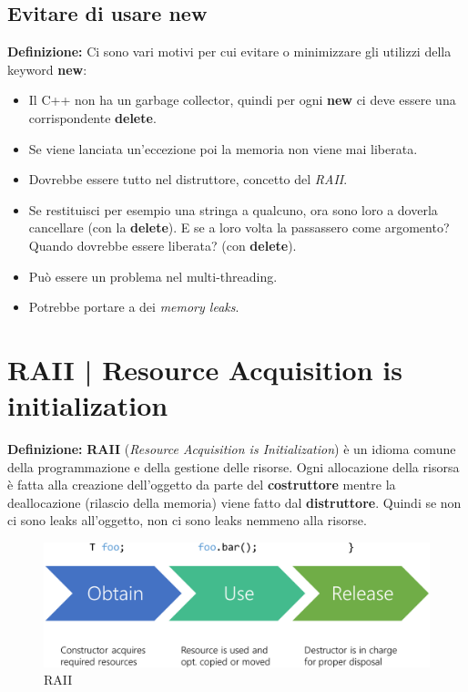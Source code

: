 \subsection{Evitare di usare new}

\textsf{\small \textbf{Definizione: } Ci sono vari motivi per cui evitare o minimizzare gli utilizzi della keyword \textbf{new}: } \\

\begin{itemize}
	\item \textsf{\small Il C++ non ha un garbage collector, quindi per ogni \textbf{new} ci deve essere una corrispondente \textbf{delete}.}
	\item \textsf{\small Se viene lanciata un'eccezione poi la memoria non viene mai liberata.}
	\item \textsf{\small Dovrebbe essere tutto nel distruttore, concetto del \emph{RAII}.}
	\item \textsf{\small Se restituisci per esempio una stringa a qualcuno, ora sono loro a doverla cancellare (con la \textbf{delete}). E se a loro volta la passassero come argomento? Quando dovrebbe essere liberata? (con \textbf{delete}).}
	\item \textsf{\small Può essere un problema nel multi-threading.}
	\item \textsf{\small Potrebbe portare a dei \emph{memory leaks}.}
\end{itemize}


\section{RAII | Resource Acquisition is initialization}

\textsf{\small \textbf{Definizione: } \textbf{RAII} (\emph{Resource Acquisition is Initialization}) è un idioma comune della programmazione e della gestione delle risorse. Ogni allocazione della risorsa è fatta alla creazione dell'oggetto da parte del \textbf{costruttore} mentre la deallocazione (rilascio della memoria) viene fatto dal \textbf{distruttore}. Quindi se non ci sono leaks all'oggetto, non ci sono leaks nemmeno alla risorse. } \\

\begin{figure}[ht]
	\centering
	\includegraphics[width=1\textwidth, height=1\textheight, keepaspectratio]{./imgs/RAII.png}
	\caption{RAII}
	\label{fig:RAII}
\end{figure}

